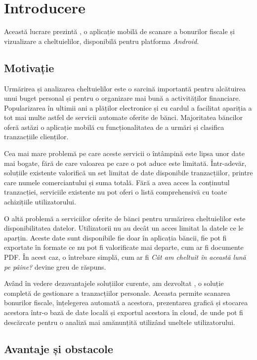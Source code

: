 \chapter{Introducere}\label{introducere}

Această lucrare prezintă \AppNameB, o aplicație mobilă de scanare a bonurilor fiscale și vizualizare a cheltuielilor, disponibilă pentru platforma \emph{Android}.

\section{Motivație}\label{motivatie_intro}

Urmărirea și analizarea cheltuielilor este o sarcină importantă pentru alcătuirea unui buget personal și pentru o organizare mai bună a activităților financiare. Popularizarea în ultimii ani a plăților electronice și cu cardul a facilitat apariția a tot mai multe astfel de servicii automate oferite de bănci. Majoritatea băncilor oferă astăzi o aplicație mobilă cu funcționalitatea de a urmări și clasifica tranzacțiile clienților.

Cea mai mare problemă pe care aceste servicii o întâmpină este lipsa unor date mai bogate, fără de care valoarea pe care o pot aduce este limitată. Într-adevăr, soluțiile existente valorifică un set limitat de date disponibile tranzacțiilor, printre care numele comerciantului și suma totală. Fără a avea acces la conținutul tranzacției, serviciile existente nu pot oferi o listă comprehensivă cu toate achizițiile utilizatorului.

O altă problemă a serviciilor oferite de bănci pentru urmărirea cheltuielilor este disponibilitatea datelor. Utilizatorii nu au decât un acces limitat la datele ce le aparțin. Aceste date sunt disponibile fie doar în aplicația băncii, fie pot fi exportate în formate ce nu pot fi valorificate mai departe, cum ar fi documente PDF. În acest caz, o întrebare simplă, cum ar fi \textit{Cât am cheltuit în această lună pe pâine?} devine greu de răspuns.

Având în vedere dezavantajele soluțiilor curente, am dezvoltat \AppName, o soluție completă de gestionare a tranzacțiilor personale. Aceasta permite scanarea bonurilor fiscale, înțelegerea automată a acestora, prezentarea grafică și stocarea acestora într-o bază de date locală și exportul acestora în cloud, de unde pot fi descărcate pentru o analiză mai amănunțită utilizând uneltele utilizatorului.

\section{Avantaje și obstacole}\label{avantaje_obstacole_intro}

